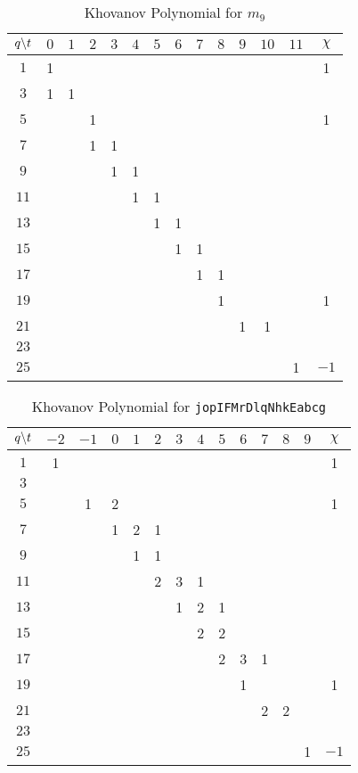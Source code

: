\begin{table}
    \centering
    \begin{tabular}{| c | c | c | c | c | c | c | c | c | c | c | c | c | c |}
        \hline
        $q\symbol{92}t$&$0$&$1$&$2$&$3$&$4$&$5$&$6$&$7$&$8$&$9$&$10$&$11$&$\chi$\\
        \hline
        $1$&1&&&&&&&&&&&&1\\
        \hline
        $3$&1&1&&&&&&&&&&&\\
        \hline
        $5$&&&1&&&&&&&&&&1\\
        \hline
        $7$&&&1&1&&&&&&&&&\\
        \hline
        $9$&&&&1&1&&&&&&&&\\
        \hline
        $11$&&&&&1&1&&&&&&&\\
        \hline
        $13$&&&&&&1&1&&&&&&\\
        \hline
        $15$&&&&&&&1&1&&&&&\\
        \hline
        $17$&&&&&&&&1&1&&&&\\
        \hline
        $19$&&&&&&&&&1&&&&1\\
        \hline
        $21$&&&&&&&&&&1&1&&\\
        \hline
        $23$&&&&&&&&&&&&&\\
        \hline
        $25$&&&&&&&&&&&&1&$-1$\\
        \hline
    \end{tabular}
    \caption{Khovanov Polynomial for $m_{9}$}
    \label{table:m_9_kho}
\end{table}
\begin{table}
    \centering
    \begin{tabular}{| c | c | c | c | c | c | c | c | c | c | c | c | c | c |}
        \hline
        $q\symbol{92}t$&$-2$&$-1$&$0$&$1$&$2$&$3$&$4$&$5$&$6$&$7$&$8$&$9$&$\chi$\\
        \hline
        $1$&1&&&&&&&&&&&&1\\
        \hline
        $3$&&&&&&&&&&&&&\\
        \hline
        $5$&&1&2&&&&&&&&&&1\\
        \hline
        $7$&&&1&2&1&&&&&&&&\\
        \hline
        $9$&&&&1&1&&&&&&&&\\
        \hline
        $11$&&&&&2&3&1&&&&&&\\
        \hline
        $13$&&&&&&1&2&1&&&&&\\
        \hline
        $15$&&&&&&&2&2&&&&&\\
        \hline
        $17$&&&&&&&&2&3&1&&&\\
        \hline
        $19$&&&&&&&&&1&&&&1\\
        \hline
        $21$&&&&&&&&&&2&2&&\\
        \hline
        $23$&&&&&&&&&&&&&\\
        \hline
        $25$&&&&&&&&&&&&1&$-1$\\
        \hline
    \end{tabular}
    \caption{Khovanov Polynomial for \texttt{jopIFMrDlqNhkEabcg}}
    \label{table:jopIFMrDlqNhkEabcg_kho}
\end{table}
